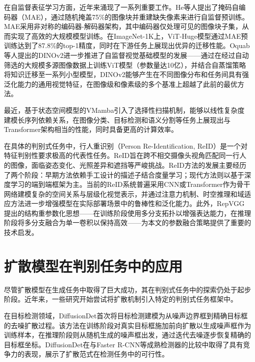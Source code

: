 在自监督表征学习方面，近年来涌现了一系列重要工作。He等人\cite{he2022masked}提出了掩码自编码器（MAE），通过随机掩盖75\%的图像块并重建缺失像素来进行自监督预训练。MAE采用非对称的编码器-解码器架构，其中编码器仅处理可见的图像块子集，从而实现了高效的大规模模型训练。在ImageNet-1K上，ViT-Huge模型通过MAE预训练达到了87.8\%的top-1精度，同时在下游任务上展现出优异的迁移性能。Oquab等人\cite{oquab2023dinov2}提出的DINOv2进一步推进了自监督视觉基础模型的发展——通过在经过自动筛选的大规模多源图像数据上训练ViT模型（参数量达10亿），并结合自蒸馏策略将知识迁移至一系列小型模型，DINOv2能够产生在不同图像分布和任务间具有强泛化能力的通用视觉特征，在图像级和像素级的多个基准上超越了此前的最优方法。

最近，基于状态空间模型的VMamba\cite{liu2024vmamba}引入了选择性扫描机制，能够以线性复杂度建模长序列依赖关系，在图像分类、目标检测和语义分割等任务上展现出与Transformer架构相当的性能，同时具备更高的计算效率。

在具体的判别式任务中，行人重识别（Person Re-Identification, ReID）\cite{ye2021deep,bedagkar2014survey}是一个对特征判别性要求极高的代表性任务。ReID旨在跨不相交摄像头视角匹配同一行人的图像，面临姿态变化、光照差异和遮挡等严峻挑战。ReID方法的发展主要经历了两个阶段：早期方法依赖手工设计的描述子\cite{liao2015person,ma2014covariance,yang2014salient}结合度量学习\cite{koestinger2012large,liao2015efficient,zheng2013reidentification}；现代方法则以基于深度学习的端到端框架为主\cite{cho2022part,fu2021unsupervised,ni2023part,wang2023self,wang2019color,wang2020high}。当前的ReID系统普遍采用CNN\cite{lecun1998gradient}或Transformer\cite{dosovitskiy2020image,vaswani2017attention}作为骨干网络建模复杂的空间关系与层级化视觉表示，并通过注意力机制\cite{dosovitskiy2020image,vaswani2017attention}、时空推理\cite{li2022autost,li2020dyngcn}和域适应方法\cite{chen2018domain}进一步增强模型在实际部署场景中的鲁棒性和泛化能力。此外，RepVGG\cite{ding2021repvgg}提出的结构重参数化思想——在训练阶段使用多分支拓扑以增强表达能力，在推理阶段将多分支融合为单一卷积以保持高效——为本文的参数融合策略提供了重要的技术启发。

\section{扩散模型在判别任务中的应用}

尽管扩散模型在生成任务中取得了巨大成功，其在判别式任务中的探索仍处于起步阶段。近年来，一些研究开始尝试将扩散机制引入特定的判别式任务框架中。

在目标检测领域，DiffusionDet\cite{chen2023diffusiondet}首次将目标检测建模为从噪声边界框到精确目标框的去噪扩散过程。该方法在训练阶段对真实目标框施加前向扩散以生成噪声框作为训练样本，在推理阶段则从随机生成的噪声框出发，通过迭代去噪逐步恢复精确的目标框坐标。DiffusionDet在与Faster R-CNN\cite{ren2015faster}等成熟检测器的比较中取得了具有竞争力的表现，展示了扩散范式在检测任务中的可行性。

